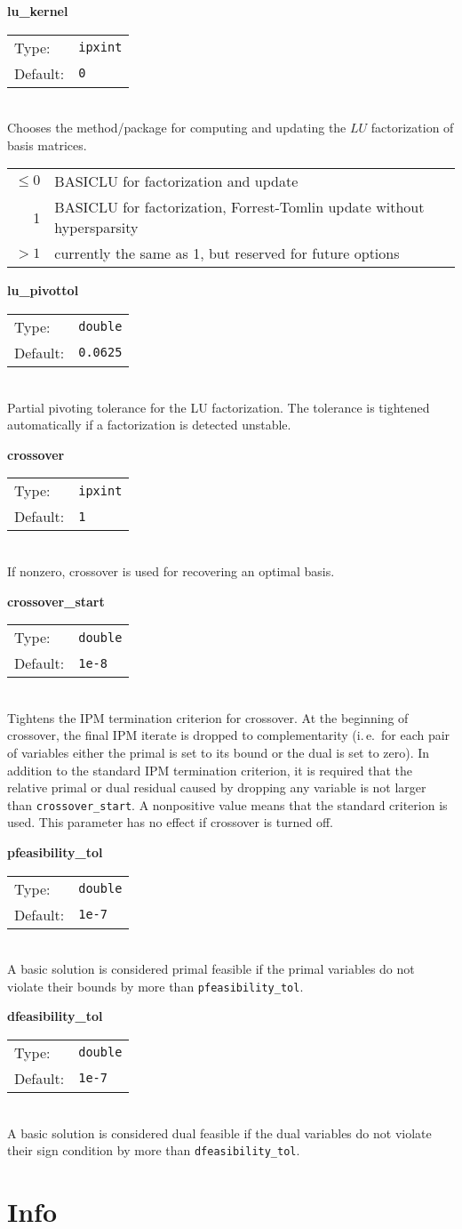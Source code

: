 \documentclass{article}
\makeatletter
\newcommand{\ct}{\texttt}
\newcommand{\param}[4]{
  \noindent\textbf{#1}\\
  \begin{tabular}{@{\hskip 0pt}ll}
    Type: & \ct{#2} \\
    Default: & \ct{#3}
  \end{tabular}\\
  #4 \vskip 1\baselineskip
}
\makeatother
\begin{document}
\param{lu\_kernel}{ipxint}{0}{
  Chooses the method/package for computing and updating the $LU$ factorization
  of basis matrices.\\
  \begin{tabular}{rl}
    $\le0$ & BASICLU for factorization and update \\
       1 & BASICLU for factorization, Forrest-Tomlin update without
       hypersparsity \\
       $>1$ & currently the same as 1, but reserved for future options
  \end{tabular}
}

\param{lu\_pivottol}{double}{0.0625}{
  Partial pivoting tolerance for the LU factorization. The tolerance is
  tightened automatically if a factorization is detected unstable.
}

\param{crossover}{ipxint}{1}{
  If nonzero, crossover is used for recovering an optimal basis.
}

\param{crossover\_start}{double}{1e-8}{
  Tightens the IPM termination criterion for crossover. At the beginning of
  crossover, the final IPM iterate is dropped to complementarity (i.\,e.\ for
  each pair of variables either the primal is set to its bound or the dual is
  set to zero). In addition to the standard IPM termination criterion, it is
  required that the relative primal or dual residual caused by dropping any
  variable is not larger than \ct{crossover\_start}. A nonpositive value means
  that the standard criterion is used. This parameter has no effect if crossover
  is turned off.
}

\param{pfeasibility\_tol}{double}{1e-7}{
  A basic solution is considered primal feasible if the primal variables do not
  violate their bounds by more than \ct{pfeasibility\_tol}.
}

\param{dfeasibility\_tol}{double}{1e-7}{
  A basic solution is considered dual feasible if the dual variables do not
  violate their sign condition by more than \ct{dfeasibility\_tol}.
}

\section{Info}
\label{sec:info}
\end{document}
